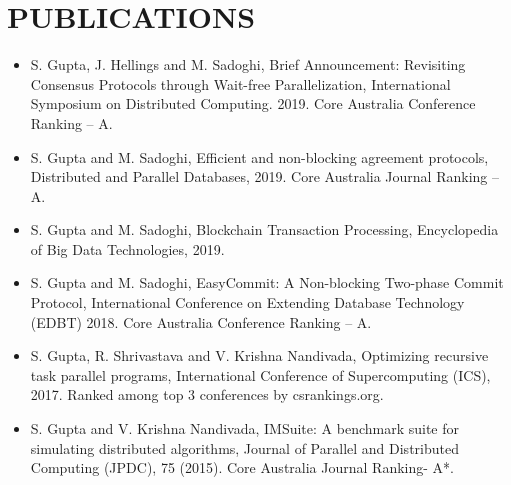 \documentclass[10pt]{article}
\begin{document}
\section*{PUBLICATIONS}
\begin{itemize}
\itemsep-0.2em

\item S. Gupta, J. Hellings and M. Sadoghi, Brief Announcement: Revisiting Consensus Protocols through Wait-free Parallelization, International Symposium on Distributed Computing. 2019. Core Australia Conference Ranking -- A.

\item S. Gupta and M. Sadoghi, Efficient and non-blocking agreement protocols, Distributed and Parallel Databases, 2019. Core Australia Journal Ranking -- A.

\item S. Gupta and M. Sadoghi, Blockchain Transaction Processing, Encyclopedia of Big Data Technologies, 2019.

\item S. Gupta and M. Sadoghi, EasyCommit: A Non-blocking Two-phase Commit Protocol, International Conference on Extending Database Technology (EDBT) 2018. Core Australia Conference Ranking -- A.

\item S. Gupta, R. Shrivastava and V. Krishna Nandivada, Optimizing recursive task parallel programs, International Conference of Supercomputing (ICS), 2017. Ranked among top 3 conferences by csrankings.org.

\item S. Gupta and V. Krishna Nandivada, IMSuite: A benchmark suite for simulating distributed algorithms, Journal of Parallel and Distributed Computing (JPDC), 75 (2015). Core Australia Journal Ranking- A*.


\end{itemize}
\end{document}
